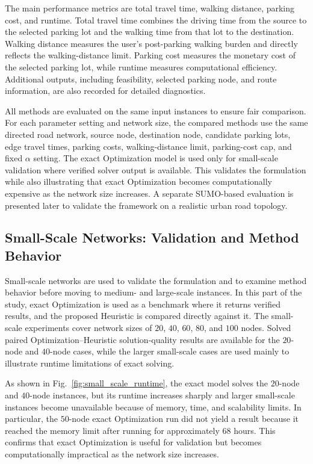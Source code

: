 The main performance metrics are total travel time, walking distance, parking cost, and runtime. Total travel time combines the driving time from the source to the selected parking lot and the walking time from that lot to the destination. Walking distance measures the user's post-parking walking burden and directly reflects the walking-distance limit. Parking cost measures the monetary cost of the selected parking lot, while runtime measures computational efficiency. Additional outputs, including feasibility, selected parking node, and route information, are also recorded for detailed diagnostics.

All methods are evaluated on the same input instances to ensure fair comparison. For each parameter setting and network size, the compared methods use the same directed road network, source node, destination node, candidate parking lots, edge travel times, parking costs, walking-distance limit, parking-cost cap, and fixed \(\alpha\) setting. The exact Optimization model is used only for small-scale validation where verified solver output is available. This validates the formulation while also illustrating that exact Optimization becomes computationally expensive as the network size increases. A separate SUMO-based evaluation is presented later to validate the framework on a realistic urban road topology.

\subsection{Small-Scale Networks: Validation and Method Behavior}

Small-scale networks are used to validate the formulation and to examine method behavior before moving to medium- and large-scale instances. In this part of the study, exact Optimization is used as a benchmark where it returns verified results, and the proposed Heuristic is compared directly against it. The small-scale experiments cover network sizes of \(20\), \(40\), \(60\), \(80\), and \(100\) nodes. Solved paired Optimization--Heuristic solution-quality results are available for the \(20\)-node and \(40\)-node cases, while the larger small-scale cases are used mainly to illustrate runtime limitations of exact solving.

As shown in Fig.~\ref{fig:small_scale_runtime}, the exact model solves the \(20\)-node and \(40\)-node instances, but its runtime increases sharply and larger small-scale instances become unavailable because of memory, time, and scalability limits. In particular, the \(50\)-node exact Optimization run did not yield a result because it reached the memory limit after running for approximately \(68\) hours. This confirms that exact Optimization is useful for validation but becomes computationally impractical as the network size increases.

